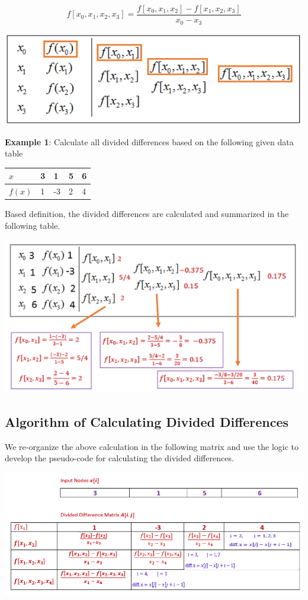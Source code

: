 \documentclass[
]{book}
\begin{document}
\[
f[x_0, x_1, x_2, x_3] = \frac{f[x_0, x_1, x_2] - f[x_1, x_2, x_3]}{x_0-x_3} 
\]

\begin{center}\includegraphics[width=0.55\linewidth]{img06/w06-DividedDifferenceTable} \end{center}

\textbf{Example 1}: Calculate all divided differences based on the following given data table

\begin{longtable}[]{@{}lllll@{}}
\toprule\noalign{}
\(x\) & 3 & 1 & 5 & 6 \\
\midrule\noalign{}
\endhead
\bottomrule\noalign{}
\endlastfoot
\(f(x)\) & 1 & -3 & 2 & 4 \\
\end{longtable}

Based definition, the divided differences are calculated and summarized in the following table.

\begin{center}\includegraphics[width=0.7\linewidth]{img06/w06-DividedDifferenceTableExample} \end{center}

\hypertarget{algorithm-of-calculating-divided-differences}{%
\subsection{Algorithm of Calculating Divided Differences}\label{algorithm-of-calculating-divided-differences}}

We re-organize the above calculation in the following matrix and use the logic to develop the pseudo-code for calculating the divided differences.

\begin{center}\includegraphics[width=0.95\linewidth]{img06/w06-codingLogic} \end{center}
\end{document}
